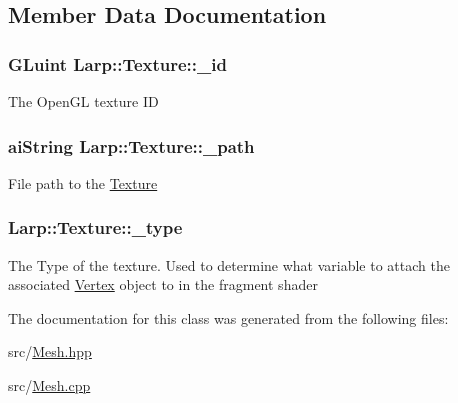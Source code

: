 \subsection{Member Data Documentation}
\hypertarget{classLarp_1_1Texture_a123213a957b3d3ca92ea5439c12a1097}{
\subsubsection[{\-\_\-id}]{\setlength{\rightskip}{0pt plus 5cm}G\-Luint Larp\-::\-Texture\-::\-\_\-id}}\label{classLarp_1_1Texture_a123213a957b3d3ca92ea5439c12a1097}
The Open\-G\-L texture I\-D \hypertarget{classLarp_1_1Texture_aed77d19ec08af05131aa054df2f937b9}{
\subsubsection[{\-\_\-path}]{\setlength{\rightskip}{0pt plus 5cm}ai\-String Larp\-::\-Texture\-::\-\_\-path}}\label{classLarp_1_1Texture_aed77d19ec08af05131aa054df2f937b9}
File path to the \hyperlink{classLarp_1_1Texture}{Texture} \hypertarget{classLarp_1_1Texture_a5db004a6f9355d7c055bbf036b5bc2f4}{
\subsubsection[{\-\_\-type}]{ Larp\-::\-Texture\-::\-\_\-type}}\label{classLarp_1_1Texture_a5db004a6f9355d7c055bbf036b5bc2f4}
The Type of the texture. Used to determine what variable to attach the associated \hyperlink{structLarp_1_1Vertex}{Vertex} object to in the fragment shader 

The documentation for this class was generated from the following files\-:\begin{DoxyCompactItemize}
\item 
src/\hyperlink{Mesh_8hpp}{Mesh.\-hpp}\item 
src/\hyperlink{Mesh_8cpp}{Mesh.\-cpp}\end{DoxyCompactItemize}
